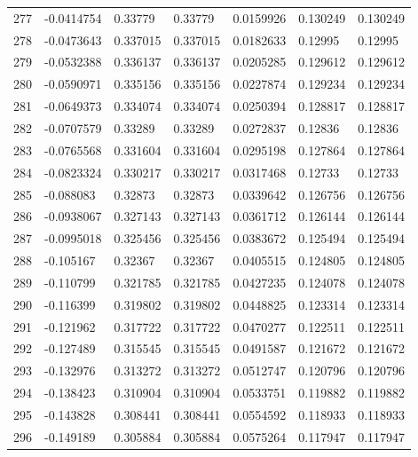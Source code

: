 \begin{longtable}{l|lll|lll}
 277 & -0.0414754   & 0.33779     & 0.33779     &  0.0159926   & 0.130249    & 0.130249    \\
 278 & -0.0473643   & 0.337015    & 0.337015    &  0.0182633   & 0.12995     & 0.12995     \\
 279 & -0.0532388   & 0.336137    & 0.336137    &  0.0205285   & 0.129612    & 0.129612    \\
 280 & -0.0590971   & 0.335156    & 0.335156    &  0.0227874   & 0.129234    & 0.129234    \\
 281 & -0.0649373   & 0.334074    & 0.334074    &  0.0250394   & 0.128817    & 0.128817    \\
 282 & -0.0707579   & 0.33289     & 0.33289     &  0.0272837   & 0.12836     & 0.12836     \\
 283 & -0.0765568   & 0.331604    & 0.331604    &  0.0295198   & 0.127864    & 0.127864    \\
 284 & -0.0823324   & 0.330217    & 0.330217    &  0.0317468   & 0.12733     & 0.12733     \\
 285 & -0.088083    & 0.32873     & 0.32873     &  0.0339642   & 0.126756    & 0.126756    \\
 286 & -0.0938067   & 0.327143    & 0.327143    &  0.0361712   & 0.126144    & 0.126144    \\
 287 & -0.0995018   & 0.325456    & 0.325456    &  0.0383672   & 0.125494    & 0.125494    \\
 288 & -0.105167    & 0.32367     & 0.32367     &  0.0405515   & 0.124805    & 0.124805    \\
 289 & -0.110799    & 0.321785    & 0.321785    &  0.0427235   & 0.124078    & 0.124078    \\
 290 & -0.116399    & 0.319802    & 0.319802    &  0.0448825   & 0.123314    & 0.123314    \\
 291 & -0.121962    & 0.317722    & 0.317722    &  0.0470277   & 0.122511    & 0.122511    \\
 292 & -0.127489    & 0.315545    & 0.315545    &  0.0491587   & 0.121672    & 0.121672    \\
 293 & -0.132976    & 0.313272    & 0.313272    &  0.0512747   & 0.120796    & 0.120796    \\
 294 & -0.138423    & 0.310904    & 0.310904    &  0.0533751   & 0.119882    & 0.119882    \\
 295 & -0.143828    & 0.308441    & 0.308441    &  0.0554592   & 0.118933    & 0.118933    \\
 296 & -0.149189    & 0.305884    & 0.305884    &  0.0575264   & 0.117947    & 0.117947    \\

\end{longtable}
